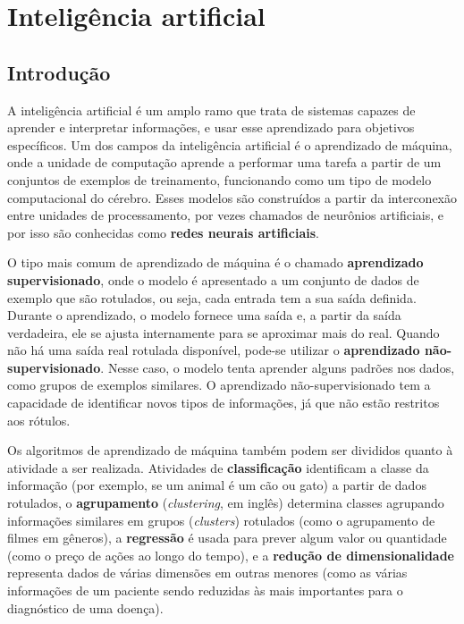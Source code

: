 \chapter{Inteligência artificial}\label{cap:ia} %
\section{Introdução}\label{sec:ia_intro}
A inteligência artificial é um amplo ramo que trata de sistemas capazes de aprender e interpretar informações, e usar esse aprendizado para objetivos específicos.
Um dos campos da inteligência artificial é o aprendizado de máquina, onde a unidade de computação aprende a performar uma tarefa a partir de um conjuntos de exemplos de treinamento,
funcionando como um tipo de modelo computacional do cérebro. Esses modelos são construídos a partir da interconexão entre unidades de processamento, por vezes chamados de neurônios artificiais, e por isso são conhecidas como \textbf{redes neurais artificiais}.

O tipo mais comum de aprendizado de máquina é o chamado \textbf{aprendizado supervisionado}, onde o modelo é apresentado a um conjunto de dados de exemplo que são rotulados, ou seja, cada entrada tem a sua saída definida. Durante o aprendizado, o modelo fornece uma saída e, a partir da saída verdadeira, ele se ajusta internamente para se aproximar mais do real.
Quando não há uma saída real rotulada disponível, pode-se utilizar o \textbf{aprendizado não-supervisionado}. Nesse caso, o modelo tenta aprender alguns padrões nos dados, como grupos de exemplos similares. O aprendizado não-supervisionado tem a capacidade de identificar novos tipos de informações, já que não estão restritos aos rótulos.

Os algoritmos de aprendizado de máquina também podem ser divididos quanto à atividade a ser realizada. Atividades de \textbf{classificação} identificam a classe da informação (por exemplo, se um animal é um cão ou gato) a partir de dados rotulados, o \textbf{agrupamento} (\textit{clustering}, em inglês) determina classes agrupando informações similares em grupos (\textit{clusters}) rotulados (como o agrupamento de filmes em gêneros), a \textbf{regressão} é usada para prever algum valor ou quantidade (como o preço de ações ao longo do tempo), e a \textbf{redução de dimensionalidade} representa dados de várias dimensões em outras menores (como as várias informações de um paciente sendo reduzidas às mais importantes para o diagnóstico de uma doença).

